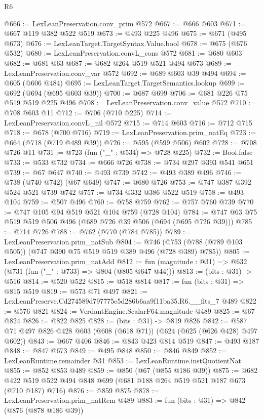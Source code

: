 \begin{lexlean}{R6}
\begin{coremodule}
@666 := LexLeanPreservation.conv_prim @572
@667 := @666 @603
@671 := @667 @119 @382 @522 @519
@673 := @493 @225 @496
@675 := @671 (@495 @673)
@676 := LexLeanTarget.TargetSyntax.Value.bool
@678 := @675 (@676 @532)
@680 := LexLeanPreservation.convL_cons @572
@681 := @680 @603
@682 := @681 @63
@687 := @682 @264 @519 @521 @494 @673
@689 := LexLeanPreservation.conv_var @572
@692 := @689 @603 @39 @494
@694 := @605 (@606 @484)
@695 := LexLeanTarget.TargetSemantics.lookup
@699 := @692 (@694 (@695 @603 @39))
@700 := @687 @699
@706 := @681 @226 @75 @519 @519 @225 @496
@708 := LexLeanPreservation.conv_value @572
@710 := @708 @603 @11
@712 := @706 (@710 @225)
@714 := LexLeanPreservation.convL_nil @572
@715 := @714 @603
@716 := @712 @715
@718 := @678 (@700 @716)
@719 := LexLeanPreservation.prim_natEq
@723 := @664 (@718 (@719 @489 @39))
@726 := @595 (@599 @506) @602
@728 := @708 @726 @11
@731 := @723 (fun ("_" : @534) => @728 @225)
@732 := Bool.false
@733 := @533 @732
@734 := @666 @726
@738 := @734 @297 @393 @541 @651
@739 := @67 @647
@740 := @493 @739
@742 := @493 @389 @496
@746 := @738 (@740 @742) (@67 @649)
@747 := @680 @726
@753 := @747 @387 @392 @524 @521 @739 @742
@757 := @734 @332 @386 @522 @519
@758 := @493 @104
@759 := @507 @496
@760 := @758 @759
@762 := @757 @760 @739
@770 := @747 @105 @94 @519 @521 @104 @759 (@728 @104)
@784 := @747 @63 @75 @519 @519 @506 @496 (@689 @726 @39 @506 (@694 (@695 @726 @39)))
@785 := @714 @726
@788 := @762 (@770 (@784 @785))
@789 := LexLeanPreservation.prim_natSub
@804 := @746 (@753 (@788 (@789 @103 @505)) (@747 @390 @75 @519 @519 @389 @496 (@728 @389) @785))
@805 := LexLeanPreservation.prim_natAdd
@812 := fun (magnitude : @31) => @632 (@731 (fun ("_" : @733) => @804 (@805 @647 @44)))
@813 := (bits : @31) -> @516
@814 := @520 @522
@815 := @518 @814
@817 := fun (bits : @31) => @815 @519
@819 := @573 @71 @497
@821 := LexLeanPreserve.Cd274589d797775e5d286b6aa9f11ba35.R6.__fits_7 @489
@822 := @576 @821
@824 := VerdantEngine.ScalarF64.magnitude @489
@825 := @67 @824
@826 := @822 @825
@828 := (bits : @31) -> @819 @826
@842 := @587 @71 @497 @826 @428 @603 (@608 (@618 @71)) (@624 (@625 (@626 @428) @497 @602))
@843 := @667 @406
@846 := @843 @423 @814 @519
@847 := @493 @187
@848 := @847 @673
@849 := @495 @848
@850 := @846 @849
@852 := LexLeanRuntime.remainder @31
@853 := LexLeanRuntime.instQuotientNat
@855 := @852 @853 @489
@859 := @850 (@67 (@855 @186 @39))
@875 := @682 @422 @519 @522 @494 @848 @699 (@681 @188 @264 @519 @521 @187 @673 (@710 @187) @716)
@876 := @859 @875
@878 := LexLeanPreservation.prim_natRem @489
@883 := fun (bits : @31) => @842 (@876 (@878 @186 @39))

\end{coremodule}
\end{lexlean}
